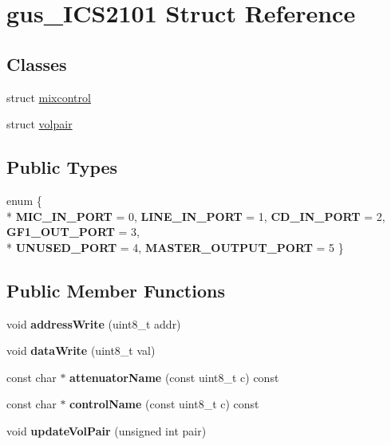 \hypertarget{structgus__ICS2101}{\section{gus\-\_\-\-I\-C\-S2101 Struct Reference}
\label{structgus__ICS2101}
}
\subsection*{Classes}
\begin{DoxyCompactItemize}
\item 
struct \hyperlink{structgus__ICS2101_1_1mixcontrol}{mixcontrol}
\item 
struct \hyperlink{structgus__ICS2101_1_1volpair}{volpair}
\end{DoxyCompactItemize}
\subsection*{Public Types}
\begin{DoxyCompactItemize}
\item 
enum \{ \\*
{\bfseries M\-I\-C\-\_\-\-I\-N\-\_\-\-P\-O\-R\-T} = 0, 
{\bfseries L\-I\-N\-E\-\_\-\-I\-N\-\_\-\-P\-O\-R\-T} = 1, 
{\bfseries C\-D\-\_\-\-I\-N\-\_\-\-P\-O\-R\-T} = 2, 
{\bfseries G\-F1\-\_\-\-O\-U\-T\-\_\-\-P\-O\-R\-T} = 3, 
\\*
{\bfseries U\-N\-U\-S\-E\-D\-\_\-\-P\-O\-R\-T} = 4, 
{\bfseries M\-A\-S\-T\-E\-R\-\_\-\-O\-U\-T\-P\-U\-T\-\_\-\-P\-O\-R\-T} = 5
 \}
\end{DoxyCompactItemize}
\subsection*{Public Member Functions}
\begin{DoxyCompactItemize}
\item 
\hypertarget{structgus__ICS2101_ae5cfaef33cf7a8a4ffde98217bf7978d}{void {\bfseries address\-Write} (uint8\-\_\-t addr)}\label{structgus__ICS2101_ae5cfaef33cf7a8a4ffde98217bf7978d}

\item 
\hypertarget{structgus__ICS2101_a07952773d1a58c0c32b32c973a1c9c9d}{void {\bfseries data\-Write} (uint8\-\_\-t val)}\label{structgus__ICS2101_a07952773d1a58c0c32b32c973a1c9c9d}

\item 
\hypertarget{structgus__ICS2101_a77532cf29af270ea68cbfb6214eca00d}{const char $\ast$ {\bfseries attenuator\-Name} (const uint8\-\_\-t c) const }\label{structgus__ICS2101_a77532cf29af270ea68cbfb6214eca00d}

\item 
\hypertarget{structgus__ICS2101_a4cbc42ec597d3c3ec564b210cb41d0d2}{const char $\ast$ {\bfseries control\-Name} (const uint8\-\_\-t c) const }\label{structgus__ICS2101_a4cbc42ec597d3c3ec564b210cb41d0d2}

\item 
\hypertarget{structgus__ICS2101_ab5f3c20eb5677d4e1ea2c78953087c95}{void {\bfseries update\-Vol\-Pair} (unsigned int pair)}\label{structgus__ICS2101_ab5f3c20eb5677d4e1ea2c78953087c95}

\end{DoxyCompactItemize}
